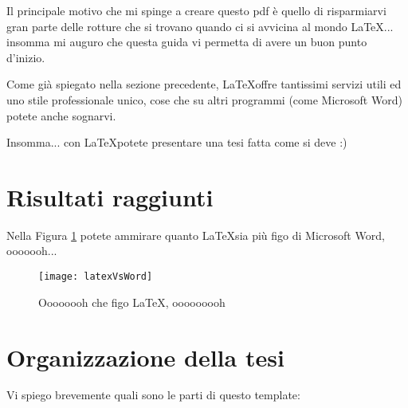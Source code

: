 Il principale motivo che mi spinge a creare questo pdf è quello di risparmiarvi gran parte delle rotture che si trovano quando ci si avvicina al mondo \LaTeX... insomma mi auguro che questa guida vi permetta di avere un buon punto d'inizio.

Come già spiegato nella sezione precedente, \LaTeX offre tantissimi servizi utili ed uno stile professionale unico, cose che su altri programmi (come Microsoft Word) potete anche sognarvi.

Insomma... con \LaTeX potete presentare una tesi fatta come si deve :)


\section{Risultati raggiunti}
\label{sec:intro3}

Nella Figura \ref{fig:latexVsWord} potete ammirare quanto \LaTeX sia più figo di Microsoft Word, ooooooh...

\begin{figure}[h] %
\centering %
\texttt{[image: latexVsWord]} %
\caption{Oooooooh che figo \LaTeX, ooooooooh} %
\label{fig:latexVsWord} %
\end{figure}


\section{Organizzazione della tesi}
\label{sec:intro4}

Vi spiego brevemente quali sono le parti di questo template:


